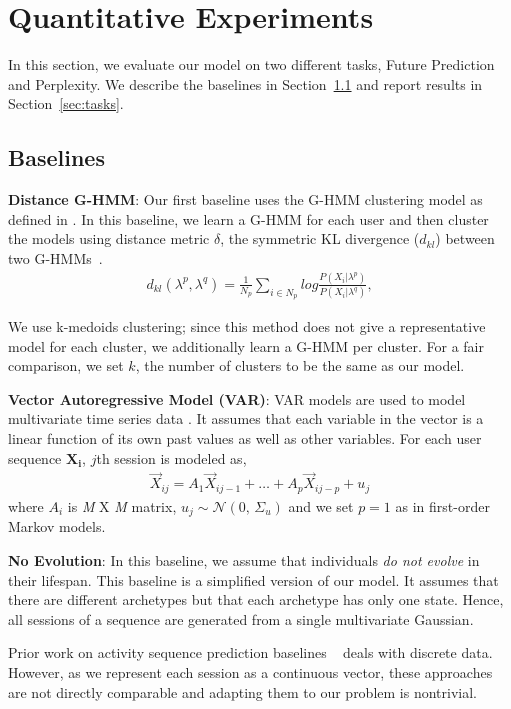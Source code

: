 \section{Quantitative Experiments}
\label{sec:experiments}
In this section, we evaluate our model on two different tasks, Future Prediction and Perplexity. We describe the baselines in Section~\ref{sec:baseline} and report results in Section~\ref{sec:tasks}.
\subsection{Baselines}
\label{sec:baseline}
\textbf{Distance G-HMM}: Our first baseline uses the G-HMM clustering model as defined in \cite{HMM2014}. In this baseline, we learn a G-HMM for each user and then cluster the models using distance metric $\delta$, the symmetric KL divergence ($d_{kl}$) between two G-HMMs~\citep{rainier}.
\begin{align}
    \label{eq:KL}
    d_{kl} (\lambda^p, \lambda^q) = \frac{1}{N_p} \sum_{i \in N_p} log \frac{P(X_i | \lambda^p)} {P(X_i | \lambda^q)},
\end{align}

We use k-medoids clustering; since this method does not give a representative model for each cluster, we additionally learn a G-HMM per cluster.
For a fair comparison, we set $k$, the number of clusters to be the same as our model.

\textbf{Vector Autoregressive Model (VAR)}: VAR models are used to model multivariate time series data \cite{Ltkepohl:2007}. It assumes that each variable in the vector is a linear function of its own past values as well as other variables. For each user sequence $\mathbf{X_i}$, $j$th session is modeled as,
\begin{align}
  \vec{X}_{ij} = A_1 \vec{X}_{ij-1} + \ldots + A_p \vec{X}_{ij-p} + u_j
\end{align}
where $A_i$ is \emph{M} X \emph{M} matrix, $u_j \sim \mathcal{N}(0,\,\Sigma_{u}) $ and we set $p=1$ as in first-order Markov models.

\textbf{No Evolution}: In this baseline, we assume that individuals \emph{do not evolve} in their lifespan. This baseline is a simplified version of our model. It assumes that there are different archetypes but that each archetype has only one state. Hence, all sessions of a sequence are generated from a single multivariate Gaussian.

Prior work on activity sequence prediction baselines ~\citep{Yang:2014, Knab2003} deals with discrete data. However, as we represent each session as a continuous vector, these approaches are not directly comparable and adapting them to our problem is nontrivial.

